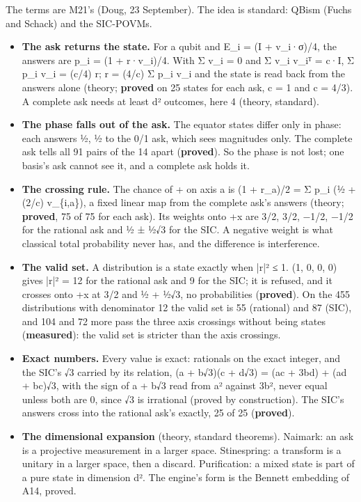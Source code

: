 The terms are M21's (Doug, 23 September). The idea is standard: QBism (Fuchs and Schack) and the SIC-POVMs.

\begin{itemize}
\item \textbf{The ask returns the state.} For a qubit and E\_\allowbreak{}i = (I + v\_\allowbreak{}i·σ)/4, the answers are p\_\allowbreak{}i = (1 + r·v\_\allowbreak{}i)/4. With Σ v\_\allowbreak{}i = 0 and Σ v\_\allowbreak{}i v\_\allowbreak{}iᵀ = c·I, Σ p\_\allowbreak{}i v\_\allowbreak{}i = (c/4) r; r = (4/c) Σ p\_\allowbreak{}i v\_\allowbreak{}i and the state is read back from the answers alone (theory; \textbf{proved} on 25 states for each ask, c = 1 and c = 4/3). A complete ask needs at least d² outcomes, here 4 (theory, standard).
\item \textbf{The phase falls out of the ask.} The equator states differ only in phase: each answers ½, ½ to the 0/1 ask, which sees magnitudes only. The complete ask tells all 91 pairs of the 14 apart (\textbf{proved}). So the phase is not lost; one basis's ask cannot see it, and a complete ask holds it.
\item \textbf{The crossing rule.} The chance of + on axis a is (1 + r\_\allowbreak{}a)/2 = Σ p\_\allowbreak{}i (½ + (2/c) v\_\allowbreak{}\{i,a\}), a fixed linear map from the complete ask's answers (theory; \textbf{proved}, 75 of 75 for each ask). Its weights onto +x are 3/2, 3/2, −1/2, −1/2 for the rational ask and ½ ± ½√3 for the SIC. A negative weight is what classical total probability never has, and the difference is interference.
\item \textbf{The valid set.} A distribution is a state exactly when |r|² ≤ 1. (1, 0, 0, 0) gives |r|² = 12 for the rational ask and 9 for the SIC; it is refused, and it crosses onto +x at 3/2 and ½ + ½√3, no probabilities (\textbf{proved}). On the 455 distributions with denominator 12 the valid set is 55 (rational) and 87 (SIC), and 104 and 72 more pass the three axis crossings without being states (\textbf{measured}): the valid set is stricter than the axis crossings.
\item \textbf{Exact numbers.} Every value is exact: rationals on the exact integer, and the SIC's √3 carried by its relation, (a + b√3)(c + d√3) = (ac + 3bd) + (ad + bc)√3, with the sign of a + b√3 read from a² against 3b², never equal unless both are 0, since √3 is irrational (proved by construction). The SIC's answers cross into the rational ask's exactly, 25 of 25 (\textbf{proved}).
\item \textbf{The dimensional expansion} (theory, standard theorems). Naimark: an ask is a projective measurement in a larger space. Stinespring: a transform is a unitary in a larger space, then a discard. Purification: a mixed state is part of a pure state in dimension d². The engine's form is the Bennett embedding of A14, proved.

\end{itemize}
